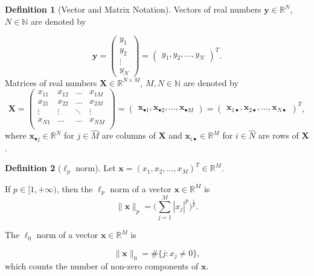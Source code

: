 \documentclass[11pt,american]{book} %
\theoremstyle{plain}
\theoremstyle{definition}
\newtheorem{defn}{Definition}
\begin{document}
\begin{defn}[Vector and Matrix Notation]
	Vectors of real numbers $\bm{y} \in \mathbb{R}^N$, $N \in \mathbb{N}$ are denoted by
	
	\begin{equation}
		\bm{y}=\begin{pmatrix}
			y_1 \\
			y_2 \\
			\vdots \\
			y_N
			
			
		\end{pmatrix} = \begin{pmatrix}
			y_1, y_2, \dots, y_N
		\end{pmatrix}^T.
	\end{equation}
	Matrices of real numbers $\bm{X} \in \mathbb{R}^{N\times M}$, $M,N \in \mathbb{N}$ are denoted by
	\begin{equation}
		\bm{X}=\begin{pmatrix}
			x_{11} & x_{12} & \dots & x_{1M}\\
			x_{21} & x_{22} & \dots & x_{2M}\\
			\vdots & \vdots & \ddots & \vdots\\
			x_{N1} & \dots & \dots & x_{NM} \\
			
			
		\end{pmatrix} = \begin{pmatrix}
			\bm{x}_{\bullet 1}, \bm{x}_{\bullet 2}, \dots, \bm{x}_{\bullet M}
		\end{pmatrix} = \begin{pmatrix}
			\bm{x}_{1 \bullet}, \bm{x}_{2 \bullet}, \dots, \bm{x}_{N \bullet}
		\end{pmatrix}^T,
	\end{equation}
	where $\bm{x}_{\bullet j} \in \mathbb{R}^{N}$ for $j \in \hat{M}$ are columns of $\bm{X}$ and $\bm{x}_{ i \bullet} \in \mathbb{R}^{M}$ for $i \in \hat{N}$ are rows of $\bm{X}$.
	
\end{defn}

\begin{defn}[{$\ell_{p}$ norm}]
	Let $\bm{{x}}= ({x}_{1},{x}_{2},\dots,{x}_{M})^{T} \in \mathbb{R}^{M}$.
	\begin{enumerate}{
			\item If $p \in [1, +\infty)$, then the $\ell_{p}$ norm of a vector $\bm{{x}} \in \mathbb{R}^M$ is 
			\begin{equation}
				\lVert \bm{x}\rVert_{p} = \Big(\sum_{j=1}^{M}|{x}_j|^{p}\Big)^{ \frac{1}{p}}
				\label{lpnorm}.
		\end{equation}}
		
		\item {The $\ell_{0}$ norm of a vector $\bm{{x}} \in \mathbb{R}^M$ is 
			
			\begin{equation}
				\lVert \bm{x} \rVert_{0} = \#\{j:{x}_j\neq 0 \}, \label{l0norm}
			\end{equation} which counts the number of non-zero components of $\bm{x}$.}
	\end{enumerate}
\end{defn}
\end{document}
